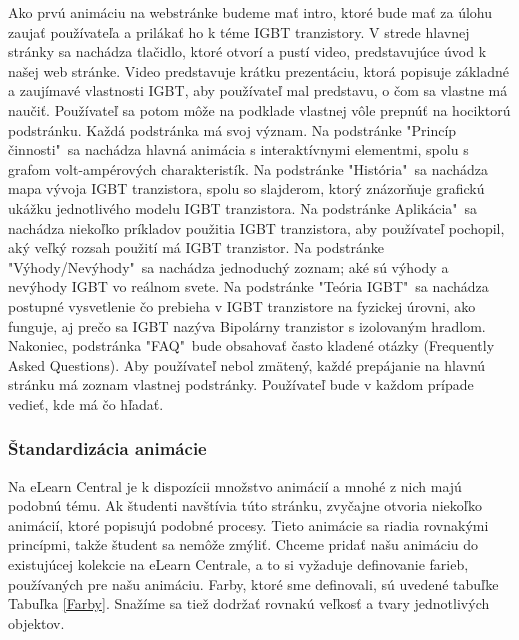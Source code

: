 Ako prvú animáciu na webstránke budeme mať intro, ktoré bude mať za úlohu zaujať používateľa a prilákať ho k téme \acrshort{IGBT} tranzistory.  V strede hlavnej stránky sa nachádza tlačidlo, ktoré otvorí a pustí video,  predstavujúce úvod k našej web stránke. Video predstavuje krátku prezentáciu, ktorá popisuje základné a zaujímavé vlastnosti \acrshort{IGBT}, aby používateľ mal predstavu, o čom sa vlastne má naučiť. Používateľ sa potom môže na podklade vlastnej vôle prepnúť na hociktorú podstránku. Každá podstránka má svoj význam. Na podstránke "Princíp činnosti"\ sa nachádza hlavná animácia s interaktívnymi elementmi, spolu s grafom volt-ampérových charakteristík. Na podstránke "História"\ sa nachádza mapa vývoja \acrshort{IGBT} tranzistora, spolu so slajderom, ktorý znázorňuje grafickú ukážku jednotlivého modelu \acrshort{IGBT} tranzistora. Na podstránke Aplikácia"\ sa nachádza niekoľko  príkladov použitia \acrshort{IGBT} tranzistora, aby používateľ pochopil, aký veľký rozsah použití má \acrshort{IGBT} tranzistor. Na podstránke "Výhody/Nevýhody"\ sa nachádza jednoduchý zoznam; aké sú výhody a nevýhody \acrshort{IGBT} vo reálnom svete. Na podstránke "Teória IGBT"\ sa nachádza postupné vysvetlenie čo prebieha v \acrshort{IGBT} tranzistore na fyzickej úrovni, ako funguje, aj prečo sa \acrshort{IGBT} nazýva Bipolárny tranzistor s izolovaným hradlom. Nakoniec, podstránka "FAQ"\ bude obsahovať často kladené otázky (Frequently Asked Questions). Aby používateľ nebol zmätený, každé prepájanie na hlavnú stránku má zoznam vlastnej podstránky. Používateľ bude v každom prípade vedieť, kde má čo hľadať.

\subsubsection{Štandardizácia animácie}
Na eLearn Central je k dispozícii množstvo animácií a mnohé z nich majú podobnú tému. Ak študenti navštívia túto stránku, zvyčajne otvoria niekoľko animácií, ktoré popisujú podobné procesy. Tieto animácie sa riadia rovnakými princípmi, takže študent sa nemôže zmýliť. Chceme pridať našu animáciu do existujúcej kolekcie na eLearn Centrale, a to si vyžaduje definovanie farieb, používaných pre našu animáciu. Farby, ktoré sme definovali, sú uvedené tabuľke Tabuľka \ref{Farby}. Snažíme sa tiež dodržať rovnakú veľkosť a tvary jednotlivých objektov.

